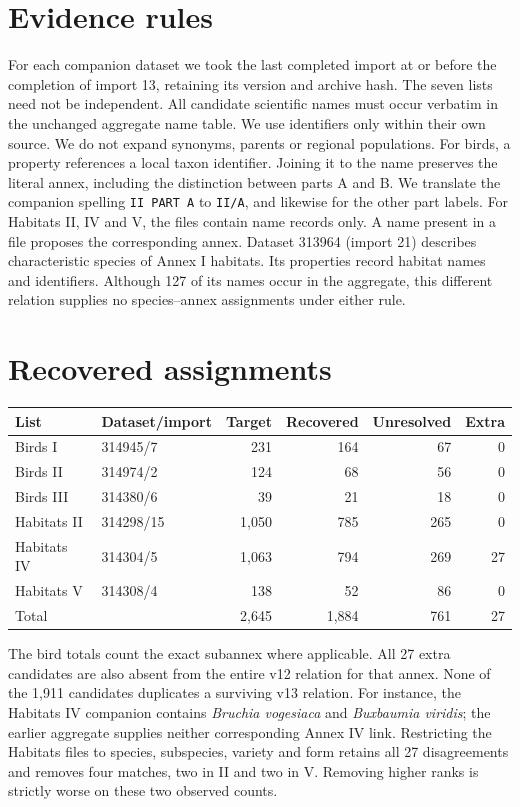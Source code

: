 \documentclass[11pt]{article}
\begin{document}
\section{Evidence rules}
For each companion dataset we took the last completed import at or before the completion of import 13, retaining its version and archive hash. The seven lists need not be independent. All candidate scientific names must occur verbatim in the unchanged aggregate name table. We use identifiers only within their own source. We do not expand synonyms, parents or regional populations.
\newpage
For birds, a property references a local taxon identifier. Joining it to the name preserves the literal annex, including the distinction between parts A and B. We translate the companion spelling \texttt{II PART A} to \texttt{II/A}, and likewise for the other part labels. For Habitats II, IV and V, the files contain name records only. A name present in a file proposes the corresponding annex. Dataset 313964 (import 21) describes characteristic species of Annex I habitats. Its properties record habitat names and identifiers. Although 127 of its names occur in the aggregate, this different relation supplies no species--annex assignments under either rule.
\section{Recovered assignments}
\begin{center}\small
\begin{tabular}{llrrrr}
\toprule
List & Dataset/import & Target & Recovered & Unresolved & Extra\\\midrule
Birds I &314945/7 &231&164&67&0\\
Birds II &314974/2 &124&68&56&0\\
Birds III &314380/6 &39&21&18&0\\
Habitats II &314298/15 &1,050&785&265&0\\
Habitats IV &314304/5 &1,063&794&269&27\\
Habitats V &314308/4 &138&52&86&0\\\midrule
Total &&2,645&1,884&761&27\\\bottomrule
\end{tabular}
\end{center}
The bird totals count the exact subannex where applicable. All 27 extra candidates are also absent from the entire v12 relation for that annex. None of the 1,911 candidates duplicates a surviving v13 relation. For instance, the Habitats IV companion contains \emph{Bruchia vogesiaca} and \emph{Buxbaumia viridis}; the earlier aggregate supplies neither corresponding Annex IV link. Restricting the Habitats files to species, subspecies, variety and form retains all 27 disagreements and removes four matches, two in II and two in V. Removing higher ranks is strictly worse on these two observed counts.
\end{document}
